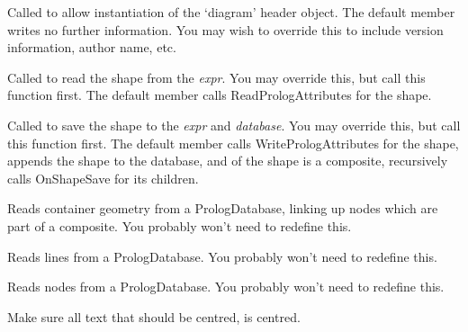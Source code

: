 Called to allow instantiation of the `diagram' header object. The default member writes no further information.
You may wish to override this to include version information, author name, etc.



Called to read the shape from the {\it expr}. You may override this, but call this function first.
The default member calls ReadPrologAttributes for the shape.



Called to save the shape to the {\it expr} and {\it database}. You may override this, but call this function first.
The default member calls WritePrologAttributes for the shape, appends the shape to the database, and of the shape
is a composite, recursively calls OnShapeSave for its children.



Reads container geometry from a PrologDatabase, linking up nodes which
are part of a composite. You probably won't need to redefine this.



Reads lines from a PrologDatabase. You probably won't need to redefine this.



Reads nodes from a PrologDatabase. You probably won't need to redefine this.




Make sure all text that should be centred, is centred.



